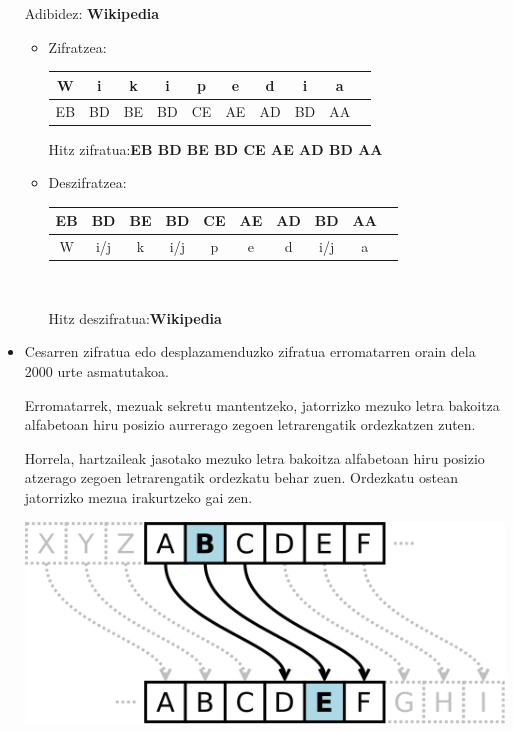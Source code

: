 \documentclass[12pt]{basque-book}
\begin{document}
\begin{itemize}
    Adibidez: \textbf{Wikipedia}
    \begin{itemize}
        \item Zifratzea:
        \begin{center}
            \begin{tabular}{c|c|c|c|c|c|c|c|c|c|}
                 W & i & k & i & p & e & d & i & a\\ 
                 \hline
                 EB & BD & BE & BD & CE & AE & AD & BD & AA
            \end{tabular}
        \end{center}
        \begin{center}
            Hitz zifratua:\textbf{EB BD BE BD CE AE AD BD AA}
        \end{center}
        \item Deszifratzea:
        \begin{center}
            \begin{tabular}{c|c|c|c|c|c|c|c|c|c|}
                EB & BD & BE & BD & CE & AE & AD & BD & AA\\
                \hline
                W & i/j & k & i/j & p & e & d & i/j & a\\ 
            \end{tabular}
            \\
        \end{center}
        \begin{center}
             Hitz deszifratua:\textbf{Wikipedia}
        \end{center}
    \end{itemize}
    
    
    \item Cesarren zifratua edo desplazamenduzko zifratua erromatarren orain dela 2000 urte asmatutakoa. 
    
    Erromatarrek, mezuak sekretu mantentzeko, jatorrizko mezuko letra bakoitza alfabetoan hiru posizio aurrerago zegoen letrarengatik ordezkatzen zuten. 
    
    Horrela, hartzaileak jasotako mezuko letra bakoitza alfabetoan hiru posizio atzerago zegoen letrarengatik ordezkatu behar zuen. Ordezkatu ostean jatorrizko mezua irakurtzeko gai zen.
    
    \includegraphics[scale=0.1]{Zesar_zifratu.png}


\end{itemize}
\end{document}
